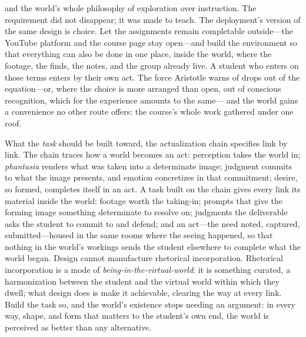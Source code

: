 and the world's whole philosophy of exploration over instruction. The
requirement did not disappear; it was made to teach. The deployment's
version of the same design is choice. Let the assignments remain
completable outside---the YouTube platform and the course page stay
open---and build the environment so that everything can also be done
in one place, inside the world, where the footage, the finds, the
notes, and the group already live. A student who enters on those terms
enters by their own act. The force Aristotle warns of drops out of the
equation---or, where the choice is more arranged than open, out of
conscious recognition, which for the experience amounts to the same---
and the world gains a convenience no other route offers: the course's
whole work gathered under one roof.

What the \textit{task} should be built toward, the actualization chain
specifies link by link. The chain traces how a world becomes an act:
perception takes the world in; \textit{phantasia} renders what was
taken into a determinate image; judgment commits to what the image
presents, and emotion concretizes in that commitment; desire, so
formed, completes itself in an act. A task built on the chain gives
every link its material inside the world: footage worth the taking-in;
prompts that give the forming image something determinate to resolve
on; judgments the deliverable asks the student to commit to and
defend; and an act---the need noted, captured, submitted---housed in
the same rooms where the seeing happened, so that nothing in the
world's workings sends the student elsewhere to complete what the
world began. Design cannot manufacture rhetorical incorporation.
Rhetorical incorporation is a mode of
\textit{being-in-the-virtual-world}: it is something curated, a
harmonization between the student and the virtual world within which
they dwell; what design does is make it achievable, clearing the way
at every link.
Build the task so, and the world's existence stops needing an
argument: in every way, shape, and form that matters to the student's
own end, the world is perceived as better than any alternative.

